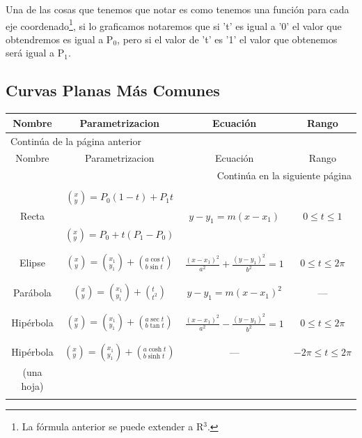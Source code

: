 \documentclass{article}
\begin{document}
Una de las cosas que tenemos que notar es como tenemos una función para cada eje coordenado\footnote{La fórmula anterior se puede extender a R\(^{\text{3}}\).}, si lo graficamos notaremos que si 't' es igual a '0' el valor que obtendremos es igual a P\(_{\text{0}}\), pero si el valor de 't' es '1' el valor que obtenemos será igual a P\(_{\text{1}}\).

\subsection{Curvas Planas Más Comunes}
\label{sec:org800d759}
\begin{longtable}{|c|c|c|c|}
\hline
Nombre & Parametrizacion & Ecuación & Rango\\
\hline
\endfirsthead
\multicolumn{4}{l}{Continúa de la página anterior} \\
\hline

Nombre & Parametrizacion & Ecuación & Rango \\

\hline
\endhead
\hline\multicolumn{4}{r}{Continúa en la siguiente página} \\
\endfoot
\endlastfoot
\hline
 &  &  & \\
 & \((^x_y)=P_0(1-t)+P_1t\) &  & \\
Recta &  & \(y-y_1=m(x-x_1)\) & \(0\leq t\leq 1\)\\
 & \((^x_y)=P_0+t(P_1-P_0)\) &  & \\
 &  &  & \\
\hline
 &  &  & \\
Elipse & \((^x_y)=(^{x_1}_{y_1})+\left(^{a\cos t}_{b\sin t}\right)\) & \(\frac{(x-x_1)^2}{a^2}+\frac{(y-y_1)^2}{b^2}=1\) & \(0\leq t\leq 2\pi\)\\
 &  &  & \\
\hline
 &  &  & \\
Parábola & \((^x_y)=(^{x_1}_{y_1})+\left(^{t}_{t^2}\right)\) & \(y-y_1=m(x-x_1)^2\) & ---\\
 &  &  & \\
\hline
 &  &  & \\
Hipérbola & \((^x_y)=(^{x_1}_{y_1})+\left(^{a\sec t}_{b\tan t}\right)\) & \(\frac{(x-x_1)^2}{a^2}-\frac{(y-y_1)^2}{b^2}=1\) & \(0\leq t\leq 2\pi\)\\
 &  &  & \\
\hline
 &  &  & \\
Hipérbola & \((^x_y)=(^{x_1}_{y_1})+\left(^{a\cosh t}_{b\sinh t}\right)\) & --- & \(-2\pi\leq t\leq 2\pi\)\\
(una hoja) &  &  & \\
 &  &  & \\
\hline
\end{longtable}
\end{document}
